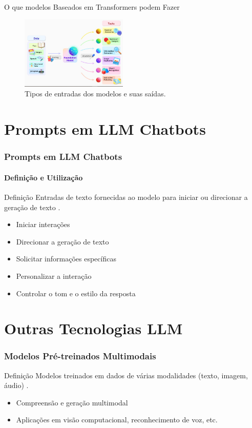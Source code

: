 \documentclass{beamer}
\begin{document}
\begin{frame}{O que modelos Baseados em Transformers podem Fazer}
    \begin{figure}[!h]
        \centering
        \includegraphics[width=2in]{images/Transformer-apps-672x459.jpg}
        \caption{Tipos de entradas dos modelos e suas saídas\cite{nvidea}.}
        \label{fig:Tipos de entradas dos modelos e suas saídas}
    \end{figure}
\end{frame}

\section{Prompts em LLM Chatbots}
\begin{frame}
    \frametitle{Prompts em LLM Chatbots}
    \framesubtitle{Definição e Utilização}
    \begin{block}{Definição}
        Entradas de texto fornecidas ao modelo para iniciar ou direcionar a geração de texto \cite{NEURIPS2020_1457c0d6}.
    \end{block}
    \begin{itemize}
        \item Iniciar interações
        \item Direcionar a geração de texto
        \item Solicitar informações específicas
        \item Personalizar a interação
        \item Controlar o tom e o estilo da resposta
    \end{itemize}
\end{frame}

\section{Outras Tecnologias LLM}
\begin{frame}
    \frametitle{Modelos Pré-treinados Multimodais}
    \begin{block}{Definição}
        Modelos treinados em dados de várias modalidades (texto, imagem, áudio) \cite{radford2021learning}.
    \end{block}
    \begin{itemize}
        \item Compreensão e geração multimodal
        \item Aplicações em visão computacional, reconhecimento de voz, etc.
    \end{itemize}
\end{frame}
\end{document}
